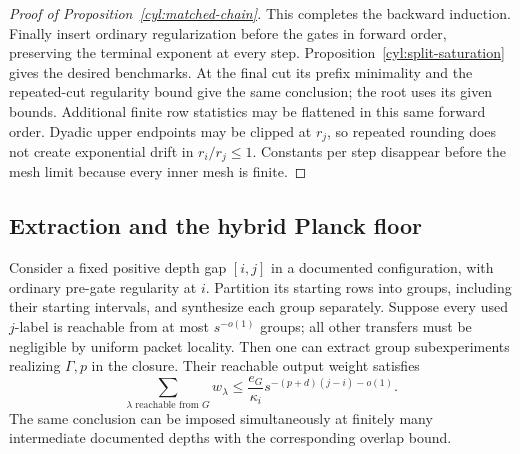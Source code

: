 \begin{proof}[Proof of Proposition~\ref{cyl:matched-chain}]
This completes the backward induction.  Finally insert ordinary
regularization before the gates in forward order, preserving the
terminal exponent at every step.  Proposition~\ref{cyl:split-saturation}
gives the desired benchmarks.  At the final cut its prefix minimality
and the repeated-cut regularity bound give the same conclusion; the
root uses its given bounds.  Additional finite row statistics may be
flattened in this same forward order.  Dyadic upper endpoints may be
clipped at $r_j$, so repeated rounding does not create exponential
drift in $r_i/r_j\le1$.  Constants per step disappear before the mesh
limit because every inner mesh is finite.
\end{proof}

\subsection{Extraction and the hybrid Planck floor}

\begin{lemma}\label{cyl:group-extraction}
Consider a fixed positive depth gap $[i,j]$ in a documented configuration,
with ordinary pre-gate regularity at $i$.  Partition its starting rows
into groups, including their starting intervals, and synthesize each
group separately.  Suppose every used $j$-label is reachable from at
most $s^{-o(1)}$ groups; all other transfers must be negligible by uniform
packet locality.  Then one can extract group subexperiments realizing
$\Gamma,p$ in the closure.  Their reachable output weight satisfies
\[
 \sum_{\lambda\text{ reachable from }G}w_\lambda
   \le \frac{e_G}{\kappa_i}
                 s^{-(p+d)(j-i)-o(1)}.
\]
The same conclusion can be imposed simultaneously at finitely many
intermediate documented depths with the corresponding overlap bound.
\end{lemma}

